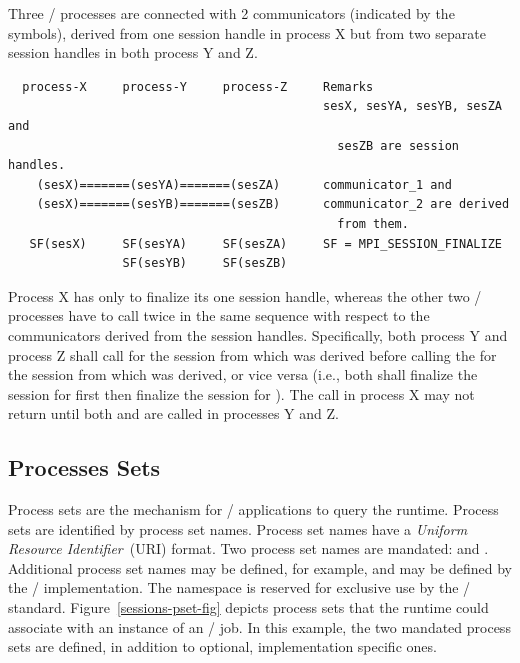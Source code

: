 \begin{example}
\label{exa:session_finalize}
Three \MPI/ processes are connected with 2 communicators (indicated by the \code{=} symbols),
derived from one session handle in process X but from two separate session handles
in both process Y and Z.
\begin{verbatim}
  process-X     process-Y     process-Z     Remarks
                                            sesX, sesYA, sesYB, sesZA and
                                              sesZB are session handles.
    (sesX)=======(sesYA)=======(sesZA)      communicator_1 and
    (sesX)=======(sesYB)=======(sesZB)      communicator_2 are derived
                                              from them.
   SF(sesX)     SF(sesYA)     SF(sesZA)     SF = MPI_SESSION_FINALIZE
                SF(sesYB)     SF(sesZB)
\end{verbatim}

Process X has only to finalize its one session handle,
whereas the other two \MPI/ processes have to call
 twice in the same sequence with respect to
the communicators derived from the session handles.
Specifically, both process Y and process Z shall call 
for the session from which  was derived before calling the
 for the session from which  was derived,
or vice versa (i.e., both shall finalize the session for 
first then finalize the session for ).
The call  in process X may not return until
both  and  are called in processes Y and Z.
\end{example}

\subsection{Processes Sets}
\label{subsec:process_sets}

Process sets are the mechanism for \MPI/ applications to query the runtime.
Process sets are identified by process set names.
Process set names have a \emph{Uniform Resource Identifier}~(URI) format.
Two process set names are mandated:  and .
Additional process set names may be defined,
for example,  and 
may be defined by the \MPI/ implementation.
The  namespace is reserved for exclusive use by the \MPI/ standard.
Figure~\ref{sessions-pset-fig} depicts process sets that the runtime could associate with an instance of an \MPI/ job.
In this example, the two mandated process sets are defined, in addition to optional, implementation specific ones.


